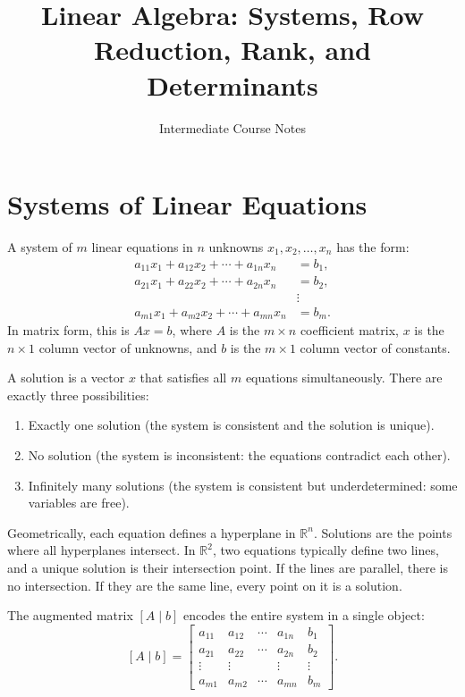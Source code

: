 \documentclass[11pt]{article}
\title{Linear Algebra: Systems, Row Reduction, Rank, and Determinants}
\author{Intermediate Course Notes}
\date{}
\begin{document}
\maketitle

\section*{Systems of Linear Equations}

A system of $m$ linear equations in $n$ unknowns $x_1, x_2, \ldots, x_n$ has the form:
\[
\begin{aligned}
a_{11} x_1 + a_{12} x_2 + \cdots + a_{1n} x_n &= b_1, \\
a_{21} x_1 + a_{22} x_2 + \cdots + a_{2n} x_n &= b_2, \\
&\vdots \\
a_{m1} x_1 + a_{m2} x_2 + \cdots + a_{mn} x_n &= b_m.
\end{aligned}
\]
In matrix form, this is $Ax = b$, where $A$ is the $m \times n$ coefficient matrix, $x$ is the $n \times 1$ column vector of unknowns, and $b$ is the $m \times 1$ column vector of constants.

A solution is a vector $x$ that satisfies all $m$ equations simultaneously. There are exactly three possibilities:
\begin{enumerate}
  \item Exactly one solution (the system is consistent and the solution is unique).
  \item No solution (the system is inconsistent: the equations contradict each other).
  \item Infinitely many solutions (the system is consistent but underdetermined: some variables are free).
\end{enumerate}

Geometrically, each equation defines a hyperplane in $\mathbb{R}^n$. Solutions are the points where all hyperplanes intersect. In $\mathbb{R}^2$, two equations typically define two lines, and a unique solution is their intersection point. If the lines are parallel, there is no intersection. If they are the same line, every point on it is a solution.

The augmented matrix $[A \mid b]$ encodes the entire system in a single object:
\[
[A \mid b] = \begin{bmatrix} a_{11} & a_{12} & \cdots & a_{1n} & b_1 \\ a_{21} & a_{22} & \cdots & a_{2n} & b_2 \\ \vdots & \vdots & & \vdots & \vdots \\ a_{m1} & a_{m2} & \cdots & a_{mn} & b_m \end{bmatrix}.
\]
\end{document}

